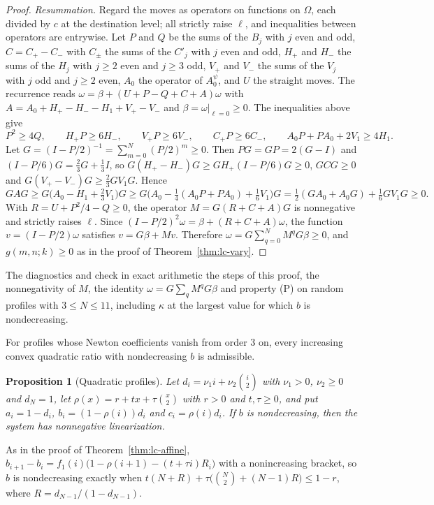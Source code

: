 \documentclass[twoside,10pt]{article}
\numberwithin{equation}{section}
\theoremstyle{slbody}
\newtheorem{proposition}[theorem]{Proposition}
\theoremstyle{definition}
\theoremstyle{remark}
\begin{document}
\begin{proof}
\emph{Resummation.} Regard the moves as operators on functions on $\Omega$, each divided by $c$ at the destination level; all strictly raise $\ell$, and inequalities between operators are entrywise. Let $P$ and $Q$ be the sums of the $B_j$ with $j$ even and odd, $C=C_+-C_-$ with $C_\pm$ the sums of the $C'_j$ with $j$ even and odd, $H_+$ and $H_-$ the sums of the $H_j$ with $j\geq2$ even and $j\geq3$ odd, $V_+$ and $V_-$ the sums of the $V_j$ with $j$ odd and $j\geq2$ even, $A_0$ the operator of $A^\psi_0$, and $U$ the straight moves. The recurrence reads $\omega=\beta+(U+P-Q+C+A)\omega$ with $A=A_0+H_+-H_--H_1+V_+-V_-$ and $\beta=\omega|_{\ell=0}\geq0$. The inequalities above give
\[
P^2\geq4Q,\qquad H_+P\geq6H_-,\qquad V_+P\geq6V_-,\qquad C_+P\geq6C_-,\qquad A_0P+PA_0+2V_1\geq4H_1.
\]
Let $G=(I-P/2)^{-1}=\sum_{m=0}^N(P/2)^m\geq0$. Then $PG=GP=2(G-I)$ and $(I-P/6)G=\frac23G+\frac13I$, so $G(H_+-H_-)G\geq GH_+(I-P/6)G\geq0$, $GCG\geq0$ and $G(V_+-V_-)G\geq\frac23GV_1G$. Hence
\[
GAG\geq G\bigl(A_0-H_1+\tfrac23V_1\bigr)G\geq G\bigl(A_0-\tfrac14(A_0P+PA_0)+\tfrac16V_1\bigr)G=\tfrac12(GA_0+A_0G)+\tfrac16GV_1G\geq0.
\]
With $R=U+P^2/4-Q\geq0$, the operator $M=G(R+C+A)G$ is nonnegative and strictly raises $\ell$. Since $(I-P/2)^2\omega=\beta+(R+C+A)\omega$, the function $v=(I-P/2)\omega$ satisfies $v=G\beta+Mv$. Therefore $\omega=G\sum_{q=0}^NM^qG\beta\geq0$, and $g(m,n;k)\geq0$ as in the proof of Theorem~\ref{thm:lc-vary}.
\end{proof}

The diagnostics  and  check in exact arithmetic the steps of this proof, the nonnegativity of $M$, the identity $\omega=G\sum_qM^qG\beta$ and property (P) on random profiles with $3\leq N\leq11$, including $\kappa$ at the largest value for which $b$ is nondecreasing.

For profiles whose Newton coefficients vanish from order $3$ on, every increasing convex quadratic ratio with nondecreasing $b$ is admissible.

\begin{proposition}[Quadratic profiles]\label{prop:lc-quadprof}
Let $d_i=\nu_1i+\nu_2\binom i2$ with $\nu_1>0$, $\nu_2\geq0$ and $d_N=1$, let $\rho(x)=r+tx+\tau\binom x2$ with $r>0$ and $t,\tau\geq0$, and put $a_i=1-d_i$, $b_i=(1-\rho(i))d_i$ and $c_i=\rho(i)d_i$. If $b$ is nondecreasing, then the system has nonnegative linearization.
\end{proposition}

As in the proof of Theorem~\ref{thm:lc-affine}, $b_{i+1}-b_i=f_1(i)\bigl(1-\rho(i+1)-(t+\tau i)R_i\bigr)$ with a nonincreasing bracket, so $b$ is nondecreasing exactly when $t(N+R)+\tau\bigl(\binom N2+(N-1)R\bigr)\leq1-r$, where $R=d_{N-1}/(1-d_{N-1})$.
\end{document}
